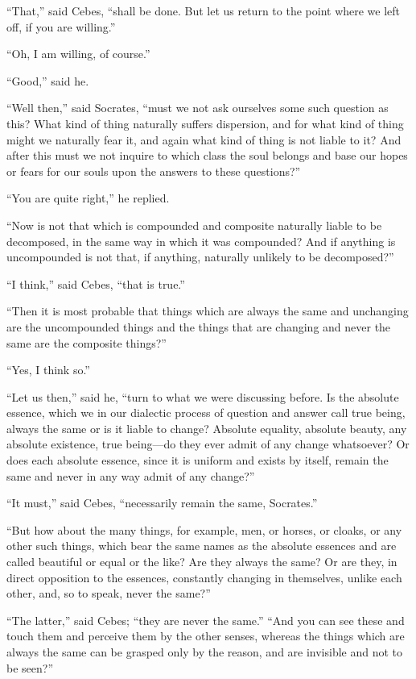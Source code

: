 \documentclass[letterpaper,12pt]{article}
\newcommand{\stephpag}[1]{\marginnote{\small\itshape\fontfamily{ppl}\selectfont #1}}
\begin{document}
\begin{drama}
``That,'' said Cebes, ``shall be done. But let us return to the point where we left off, \stephpag{b} if you are willing.''
 
``Oh, I am willing, of course.''
 
``Good,'' said he.
 
``Well then,'' said Socrates, ``must we not ask ourselves some such question as this? What kind of thing naturally suffers dispersion, and for what kind of thing might we naturally fear it, and again what kind of thing is not liable to it? And after this must we not inquire to which class the soul belongs and base our hopes or fears for our souls upon the answers to these questions?''
 
``You are quite right,'' he replied.
 
``Now is not that which is compounded \stephpag{c} and composite naturally liable to be decomposed, in the same way in which it was compounded? And if anything is uncompounded is not that, if anything, naturally unlikely to be decomposed?''
 
``I think,'' said Cebes, ``that is true.''
 
``Then it is most probable that things which are always the same and unchanging are the uncompounded things and the things that are changing and never the same are the composite things?''
 
``Yes, I think so.''
 
``Let us then,'' said he, ``turn to what we were discussing before. \stephpag{d} Is the absolute essence, which we in our dialectic process of question and answer call true being, always the same or is it liable to change? Absolute equality, absolute beauty, any absolute existence, true being---do they ever admit of any change whatsoever? Or does each absolute essence, since it is uniform and exists by itself, remain the same and never in any way admit of any change?''
 
``It must,'' said Cebes, ``necessarily remain the same, \stephpag{e} Socrates.''
 
``But how about the many things, for example, men, or horses, or cloaks, or any other such things, which bear the same names as the absolute essences and are called beautiful or equal or the like? Are they always the same? Or are they, in direct opposition to the essences, constantly changing in themselves, unlike each other, and, so to speak, never the same?''
 
``The latter,'' said Cebes; ``they are never the same.'' \stephpag{79 a} ``And you can see these and touch them and perceive them by the other senses, whereas the things which are always the same can be grasped only by the reason, and are invisible and not to be seen?''
 

\end{drama}
\end{document}
